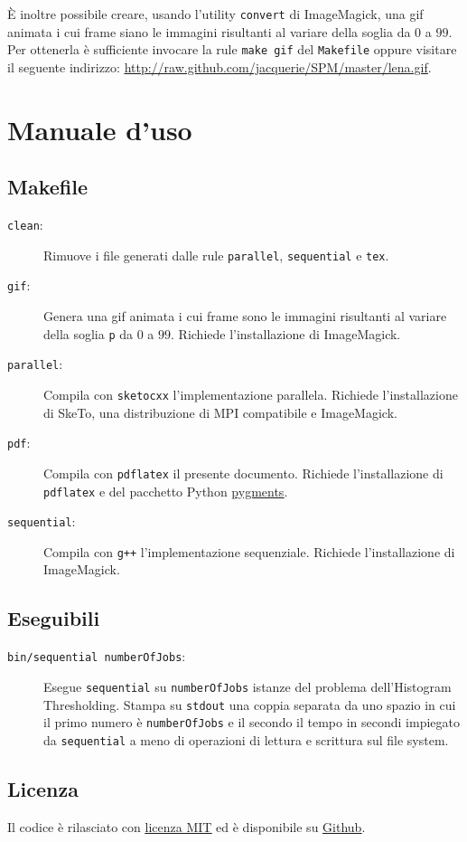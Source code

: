 \documentclass[12pt]{article}
\begin{document}
    È inoltre possibile creare, usando l'utility \texttt{convert} di
    ImageMagick, una gif animata i cui frame siano le immagini risultanti
    al variare della soglia da \(0\) a \(99\). Per ottenerla \`e sufficiente
    invocare la rule \texttt{make gif} del \texttt{Makefile} oppure visitare il
    seguente indirizzo: \href{http://raw.github.com/jacquerie/SPM/master/lena.gif}{\underline{http://raw.github.com/jacquerie/SPM/master/lena.gif}}.

  \newpage

  \appendix
    \section{Manuale d'uso}
      \subsection{Makefile}

      \begin{description}
        \item[\texttt{clean}:] Rimuove i file generati dalle rule \texttt{parallel}, \texttt{sequential} e \texttt{tex}.
        \item[\texttt{gif}:] Genera una gif animata i cui frame sono le
          immagini risultanti al variare della soglia \texttt{p} da \(0\) a
          \(99\). Richiede l'installazione di ImageMagick.
        \item[\texttt{parallel}:] Compila con \texttt{sketocxx}
          l'implementazione parallela. Richiede l'installazione di SkeTo, una
          distribuzione di MPI compatibile e ImageMagick.
  	\item[\texttt{pdf}:] Compila con \texttt{pdflatex} il presente
          documento. Richiede l'installazione di \texttt{pdflatex} e del
          pacchetto Python \href{http://pygments.org}{\underline{pygments}}.
        \item[\texttt{sequential}:] Compila con \texttt{g++} l'implementazione
          sequenziale. Richiede l'installazione di ImageMagick.
      \end{description}

      \subsection{Eseguibili}

      \begin{description}
        \item[\texttt{bin/sequential numberOfJobs}:] Esegue \texttt{sequential}
          su \texttt{numberOfJobs} istanze del problema dell'Histogram
          Thresholding. Stampa su \texttt{stdout} una coppia separata da uno
          spazio in cui il primo numero \`e \texttt{numberOfJobs} e il secondo
          il tempo in secondi impiegato da \texttt{sequential} a meno di
          operazioni di lettura e scrittura sul file system. 
      \end{description}

      \subsection{Licenza}

      Il codice \`e rilasciato con \href{http://opensource.org/licenses/MIT}{\underline{licenza MIT}}
      ed \`e disponibile su \href{https://github.com/jacquerie/SPM}{\underline{Github}}.
\end{document}
